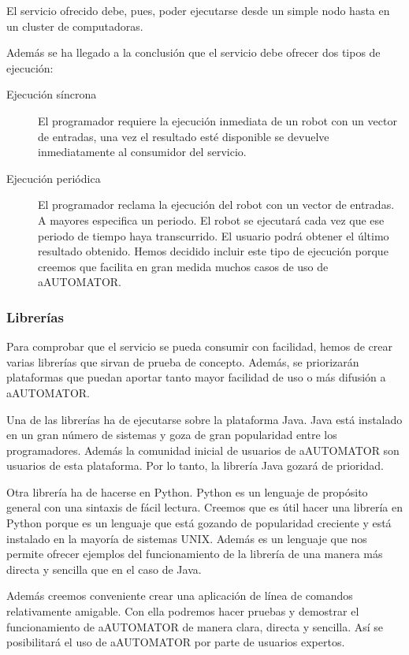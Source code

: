 El servicio ofrecido debe, pues, poder ejecutarse desde un simple nodo
hasta en un cluster de computadoras.

Además se ha llegado a la conclusión que el servicio debe ofrecer dos
tipos de ejecución:

\begin{description}
  \item[Ejecución síncrona] El programador requiere la ejecución
    inmediata de un robot con un vector de entradas, una vez el
    resultado esté disponible se devuelve inmediatamente al consumidor
    del servicio.
  \item[Ejecución periódica] El programador reclama la ejecución del
    robot con un vector de entradas. A mayores especifica un
    periodo. El robot se ejecutará cada vez que ese periodo de tiempo
    haya transcurrido. El usuario podrá obtener el último resultado
    obtenido. Hemos decidido incluir este tipo de ejecución porque
    creemos que facilita en gran medida muchos casos de uso de
    aAUTOMATOR.

\end{description}

\subsubsection{Librerías}

Para comprobar que el servicio se pueda consumir con facilidad, hemos
de crear varias librerías que sirvan de prueba de concepto. Además, se
priorizarán plataformas que puedan aportar tanto mayor facilidad de
uso o más difusión a aAUTOMATOR.

Una de las librerías ha de ejecutarse sobre la plataforma Java. Java
está instalado en un gran número de sistemas y goza de gran
popularidad entre los programadores. Además la comunidad inicial de
usuarios de aAUTOMATOR son usuarios de esta plataforma. Por lo tanto,
la librería Java gozará de prioridad.

Otra librería ha de hacerse en Python\cite{PYTHON}. Python es un
lenguaje de propósito general con una sintaxis de fácil
lectura. Creemos que es útil hacer una librería en Python porque es un
lenguaje que está gozando de popularidad creciente y está instalado en
la mayoría de sistemas UNIX\cite{UNIX}. Además es un lenguaje que nos
permite ofrecer ejemplos del funcionamiento de la librería de una
manera más directa y sencilla que en el caso de Java.

Además creemos conveniente crear una aplicación de línea de comandos
relativamente amigable. Con ella podremos hacer pruebas y demostrar el
funcionamiento de aAUTOMATOR de manera clara, directa y sencilla. Así
se posibilitará el uso de aAUTOMATOR por parte de usuarios
expertos.


